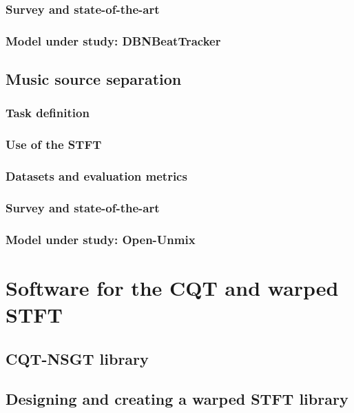 \documentclass[letter,12pt,notitlepage]{article}
\begin{document}
\subsubsection{Survey and state-of-the-art}

\subsubsection{Model under study: DBNBeatTracker}

\subsection{Music source separation}

\subsubsection{Task definition}

\subsubsection{Use of the STFT}

\subsubsection{Datasets and evaluation metrics}

\subsubsection{Survey and state-of-the-art}

\subsubsection{Model under study: Open-Unmix}

\vfill
\clearpage

\section{Software for the CQT and warped STFT}
\label{sec:libraries}

\subsection{CQT-NSGT library}

\subsection{Designing and creating a warped STFT library}
\end{document}
